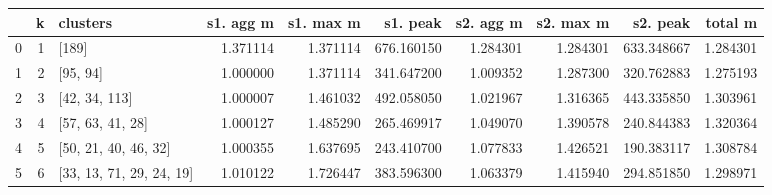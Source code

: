 \begin{tabular}{lrlrrrrrrr}
\toprule
{} &  k &                  clusters &  s1. agg m &  s1. max m &    s1. peak &  s2. agg m &  s2. max m &    s2. peak &   total m \\
\midrule
0 &  1 &                     [189] &   1.371114 &   1.371114 &  676.160150 &   1.284301 &   1.284301 &  633.348667 &  1.284301 \\
1 &  2 &                  [95, 94] &   1.000000 &   1.371114 &  341.647200 &   1.009352 &   1.287300 &  320.762883 &  1.275193 \\
2 &  3 &             [42, 34, 113] &   1.000007 &   1.461032 &  492.058050 &   1.021967 &   1.316365 &  443.335850 &  1.303961 \\
3 &  4 &          [57, 63, 41, 28] &   1.000127 &   1.485290 &  265.469917 &   1.049070 &   1.390578 &  240.844383 &  1.320364 \\
4 &  5 &      [50, 21, 40, 46, 32] &   1.000355 &   1.637695 &  243.410700 &   1.077833 &   1.426521 &  190.383117 &  1.308784 \\
5 &  6 &  [33, 13, 71, 29, 24, 19] &   1.010122 &   1.726447 &  383.596300 &   1.063379 &   1.415940 &  294.851850 &  1.298971 \\
\bottomrule
\end{tabular}
